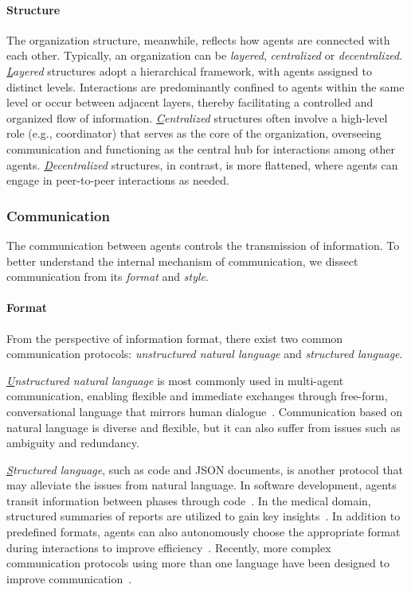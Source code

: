 \paragraph{Structure} %
The organization structure, meanwhile, reflects how agents are connected with each other. Typically, an organization can be \textit{layered}, \textit{centralized} or \textit{decentralized}.
\textit{{\ul Layered}} structures adopt a hierarchical framework, with agents assigned to distinct levels. Interactions are predominantly confined to agents within the same level or occur between adjacent layers, thereby facilitating a controlled and organized flow of information\cite{hamilton2023blind,hao2023chatllm,qian2024chatdev}.
\textit{{\ul Centralized}} structures often involve a high-level role (e.g., coordinator) that serves as the core of the organization, overseeing communication and functioning as the central hub for interactions among other agents\cite{jin2024if,li2024culturepark,fan2024ai}.
\textit{{\ul Decentralized}} structures, in contrast, is more flattened, where agents can engage in peer-to-peer interactions as needed\cite{chan2023chateval,ma2024debate,liang2023encouraging}.

\subsubsection{Communication}
The communication between agents controls the transmission of information. To better understand the internal mechanism of communication, we dissect communication from its \textit{format} and \textit{style}.

\paragraph{Format}
From the perspective of information format, there exist two common communication protocols: \textit{unstructured natural language} and \textit{structured language}.

\textit{{\ul Unstructured natural language}} is most commonly used in multi-agent communication, enabling flexible and immediate exchanges through free-form, conversational language that mirrors human dialogue~\cite{nair2023dera,li2023camel,fu2023improving,xiong2023examining,du2023improving,zheng2023chatgpt,yang2024social,yan2024social}. Communication based on natural language is diverse and flexible, but it can also suffer from issues such as ambiguity and redundancy.

\textit{{\ul Structured language}}, such as code and JSON documents, is another protocol that may alleviate the issues from natural language.
In software development, agents transit information between phases through code~\cite{hong2023metagpt,qian2024chatdev}. In the medical domain, structured summaries of reports are utilized to gain key insights~\cite{tang2023medagents}. In addition to predefined formats, agents can also autonomously choose the appropriate format during interactions to improve efficiency~\cite{chen2024beyond,chen2024optima}. Recently, more complex communication protocols using more than one language have been designed to improve communication~\cite{marro2024scalable}.

